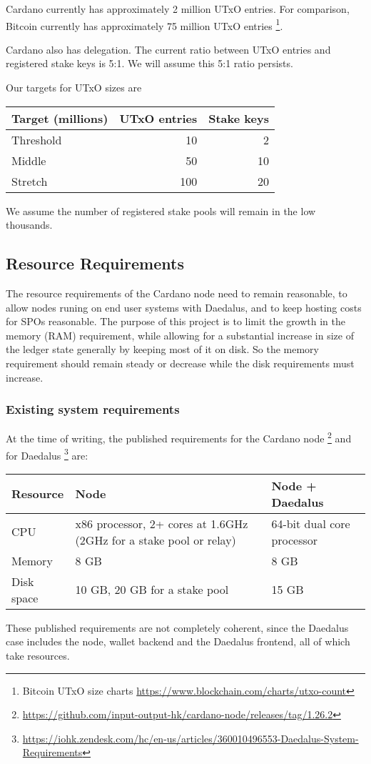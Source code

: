 \documentclass[11pt,a4paper]{article}
\begin{document}
Cardano currently has approximately 2 million UTxO entries. For comparison,
Bitcoin currently has approximately 75 million UTxO entries%
\footnote{Bitcoin UTxO size charts \url{https://www.blockchain.com/charts/utxo-count}}.

Cardano also has delegation. The current ratio between UTxO entries
and registered stake keys is 5:1. We will assume this 5:1 ratio persists.

Our targets for UTxO sizes are

\begin{center}
\begin{tabular}[]{lrr}
  Target (millions) & UTxO entries & Stake keys \\
  \toprule
  Threshold &  10  &  2 \\
  Middle    &  50  & 10 \\
  Stretch   & 100  & 20
\end{tabular}
\end{center}

We assume the number of registered stake pools will remain in the low thousands.

\subsection{Resource Requirements}
\label{resource-requirements}

The resource requirements of the Cardano node need to remain reasonable, to
allow nodes runing on end user systems with Daedalus, and to keep hosting costs
for SPOs reasonable. The purpose of this project is to limit the growth in the
memory (RAM) requirement, while allowing for a substantial increase in size of
the ledger state generally by keeping most of it on disk. So the memory
requirement should remain steady or decrease while the disk requirements must
increase.

\subsubsection{Existing system requirements}

At the time of writing, the published requirements for the Cardano node%
\footnote{\url{https://github.com/input-output-hk/cardano-node/releases/tag/1.26.2}}
and for Daedalus%
\footnote{\url{https://iohk.zendesk.com/hc/en-us/articles/360010496553-Daedalus-System-Requirements}}
are:

\begin{center}
\begin{tabular}[]{lp{6cm}p{5cm}}
  Resource    & Node & Node + Daedalus \\
  \toprule
  CPU         &  x86 processor, 2+ cores at 1.6GHz (2GHz for a stake pool or relay)  & 64-bit dual core processor \\
  Memory      &  8 GB  & 8 GB \\
  Disk space  & 10 GB, 20 GB for a stake pool & 15 GB
\end{tabular}
\end{center}
These published requirements are not completely coherent, since the Daedalus
case includes the node, wallet backend and the Daedalus frontend, all of which
take resources.
\end{document}
